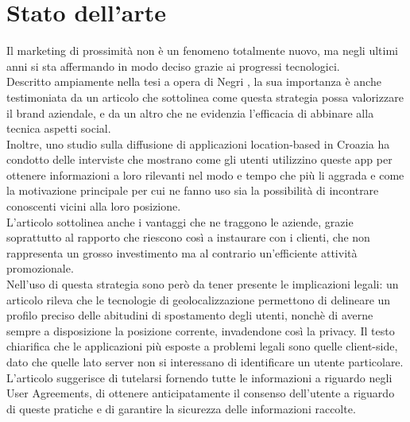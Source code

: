\chapter{Stato dell'arte}

Il marketing di prossimità non è un fenomeno totalmente nuovo, ma negli ultimi anni si sta affermando in modo deciso grazie ai progressi tecnologici.\\
Descritto ampiamente nella tesi a opera di Negri \cite{rif1}, la sua importanza è anche testimoniata da un articolo \cite{rif4} che sottolinea come questa strategia possa valorizzare il brand aziendale, e da un altro \cite{rif3} che ne evidenzia l'efficacia di abbinare alla tecnica aspetti social.\\[0.2cm]

Inoltre, uno studio sulla diffusione di applicazioni location-based in Croazia \cite{rif8} ha condotto delle interviste che mostrano come gli utenti utilizzino queste app per ottenere informazioni a loro rilevanti nel modo e tempo che più li aggrada e come la motivazione principale per cui ne fanno uso sia la possibilità di incontrare conoscenti vicini alla loro posizione.\\ 
L’articolo sottolinea anche i vantaggi che ne traggono le aziende, grazie soprattutto al rapporto che riescono così a instaurare con i clienti, che non rappresenta un grosso investimento ma al contrario un’efficiente attività promozionale.\\
Nell'uso di questa strategia sono però da tener presente le implicazioni legali: un articolo \cite{rif2} rileva che le tecnologie di geolocalizzazione permettono di delineare un profilo preciso delle abitudini di spostamento degli utenti, nonchè di averne sempre a disposizione la posizione corrente, invadendone così la privacy.
Il testo chiarifica che le applicazioni più esposte a problemi legali sono quelle client-side, dato che quelle lato server non si interessano di identificare un utente particolare.\\
L'articolo suggerisce di tutelarsi fornendo tutte le informazioni a riguardo negli User Agreements, di ottenere anticipatamente il consenso dell'utente a riguardo di queste pratiche e di garantire la sicurezza delle informazioni raccolte.\\[0.2cm]

